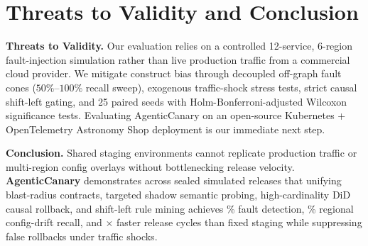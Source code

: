 \section{Threats to Validity and Conclusion}
\label{sec:conclusion}

\textbf{Threats to Validity.} Our evaluation relies on a controlled 12-service, 6-region fault-injection simulation rather than live production traffic from a commercial cloud provider. We mitigate construct bias through decoupled off-graph fault cones ($50\%$--$100\%$ recall sweep), exogenous traffic-shock stress tests, strict causal shift-left gating, and 25 paired seeds with Holm-Bonferroni-adjusted Wilcoxon significance tests. Evaluating AgenticCanary on an open-source Kubernetes + OpenTelemetry Astronomy Shop deployment is our immediate next step.

\textbf{Conclusion.} Shared staging environments cannot replicate production traffic or multi-region config overlays without bottlenecking release velocity. \textbf{AgenticCanary} demonstrates across \TotalSimReleases{} sealed simulated releases that unifying blast-radius contracts, targeted shadow semantic probing, high-cardinality DiD causal rollback, and shift-left rule mining achieves \ACDetPct{}\% fault detection, \ACDriftPct{}\% regional config-drift recall, and \CycleSpeedupVsStaging{}$\times$ faster release cycles than fixed staging while suppressing false rollbacks under traffic shocks.
